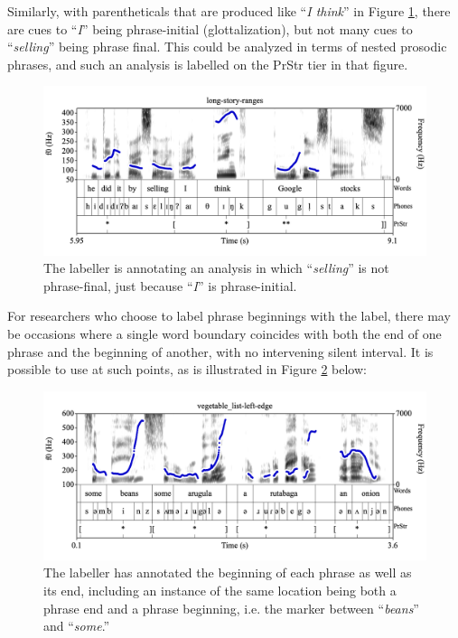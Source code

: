 \documentclass[11pt, twoside]{memoir}
\def\textlabel#1{{\relsize{-.5}\fontspec[Mapping=tex-text]{Roboto Mono}{#1}}}
\def\langtext#1{\textit{#1}}
\begin{document}
Similarly, with parentheticals that are produced like “\langtext{I think}” in Figure \ref{fig:long-story-ranges PrStr Adv}, there are cues to “\langtext{I}” being phrase-initial (glottalization), but not many cues to “\langtext{selling}” being phrase final. This could be analyzed in terms of nested prosodic phrases, and such an analysis is labelled on the PrStr tier in that figure.

\begin{figure}[H]
\centering
%
\includegraphics[width=.875\linewidth]{PrStr-long-story-ranges-adv.png}
%
\caption{The labeller is annotating an analysis in which “\langtext{selling}” is not phrase-final, just because “\langtext{I}” is phrase-initial.%
\label{fig:long-story-ranges PrStr Adv}%
}
\end{figure}

For researchers who choose to label phrase beginnings with the \textlabel{[} label, there may be occasions where a single word boundary coincides with both the end of one phrase and the beginning of another, with no intervening silent interval. It is possible to use \textlabel{][} at such points, as is illustrated in Figure \ref{fig:vegetable_list PrStr Adv} below:

\begin{figure}[H]
\centering
%
\includegraphics[width=.875\linewidth]{PrStr-vegetable_list-adv.png}
%
\caption[The labeller has annotated the beginning of each phrase as well as its end.]{The labeller has annotated the beginning of each phrase as well as its end, including an instance of the same location being both a phrase end and a phrase beginning, i.e. the marker between “\langtext{beans}” and “\langtext{some}.”%
\label{fig:vegetable_list PrStr Adv}%
}
\end{figure}
\end{document}
